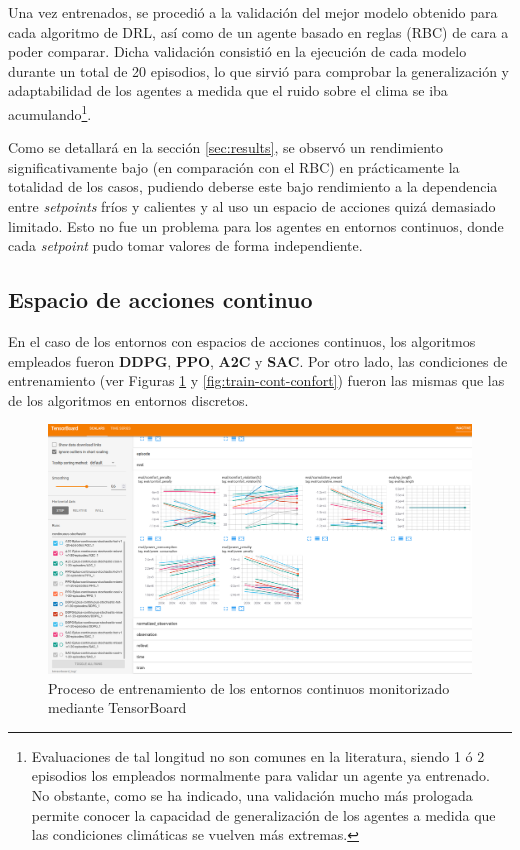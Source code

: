 Una vez entrenados, se procedió a la validación del mejor modelo obtenido para cada algoritmo de DRL, así como de un agente basado en reglas (RBC) de cara a poder comparar. Dicha validación consistió en la ejecución de cada modelo durante un total de 20 episodios, lo que sirvió para comprobar la generalización y adaptabilidad de los agentes a medida que el ruido sobre el clima se iba acumulando\footnote{Evaluaciones de tal longitud no son comunes en la literatura, siendo 1 ó 2 episodios los empleados normalmente para validar un agente ya entrenado. No obstante, como se ha indicado, una validación mucho más prologada permite conocer la capacidad de generalización de los agentes a medida que las condiciones climáticas se vuelven más extremas.}.

Como se detallará en la sección \ref{sec:results}, se observó un rendimiento significativamente bajo (en comparación con el RBC) en prácticamente la totalidad de los casos, pudiendo deberse este bajo rendimiento a la dependencia entre \textit{setpoints} fríos y calientes y al uso un espacio de acciones quizá demasiado limitado. Esto no fue un problema para los agentes en entornos continuos, donde cada \textit{setpoint} pudo tomar valores de forma independiente.

\FloatBarrier
\subsection{Espacio de acciones continuo}

En el caso de los entornos con espacios de acciones continuos, los algoritmos empleados fueron \textbf{DDPG}, \textbf{PPO}, \textbf{A2C} y \textbf{SAC}. Por otro lado, las condiciones de entrenamiento (ver Figuras \ref{fig:train-cont} y \ref{fig:train-cont-confort}) fueron las mismas que las de los algoritmos en entornos discretos.

\begin{figure}
    \centering
    \includegraphics[width=\textwidth]{imagenes/entrenamiento-continuos.png}
    \caption{Proceso de entrenamiento de los entornos continuos monitorizado mediante TensorBoard}
    \label{fig:train-cont}
\end{figure}

